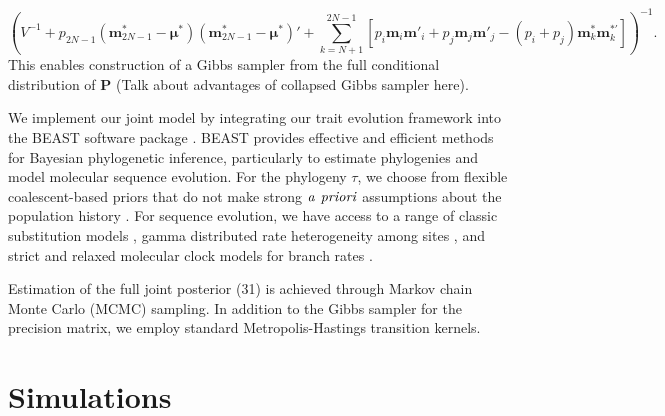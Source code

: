 \documentclass[12pt]{article}
\begin{document}
\begin{equation}
\left( V^{-1} + p_{2N-1}(\textbf{m}^*_{2N-1} - \boldsymbol \mu^*)(\textbf{m}^*_{2N-1} - \boldsymbol \mu^*)'  
+ \sum_{k=N+1}^{2N-1} [ p_i \textbf{m}_i \textbf{m}'_i + p_j \textbf{m}_j \textbf{m}'_j - (p_i + p_j)\textbf{m}^*_k \textbf{m}^{*'}_k]  \right)^{-1} . 
\end{equation}
This enables construction of a Gibbs sampler from the full conditional distribution of $\textbf{P}$ (Talk about 
advantages of collapsed Gibbs sampler here).
\par
We implement our joint model by integrating our trait evolution framework into the BEAST software package 
\citep{Drummond2012}.  BEAST provides effective and efficient methods for Bayesian phylogenetic inference,   
particularly to estimate phylogenies and model molecular sequence evolution.  For the phylogeny $\tau$, we
choose from flexible coalescent-based priors that do not make strong $\it{a}$ $\it{priori}$ assumptions
about the population history \citep{Drummond2005, Minin2008, Gill2013}.  For sequence evolution, 
we have access to a range of classic substitution models \citep{Kimura1980, Felsenstein81, Hasegawa1985},
gamma distributed rate heterogeneity among sites \citep{Yang1994}, and strict and relaxed molecular 
clock models for branch rates \citep{Drummond2006}.
\par
Estimation of the full joint posterior (31) is achieved through Markov chain Monte Carlo (MCMC) sampling.  
In addition to the Gibbs sampler for the precision matrix, we employ standard Metropolis-Hastings transition
kernels.


\section{Simulations} 
\end{document}

